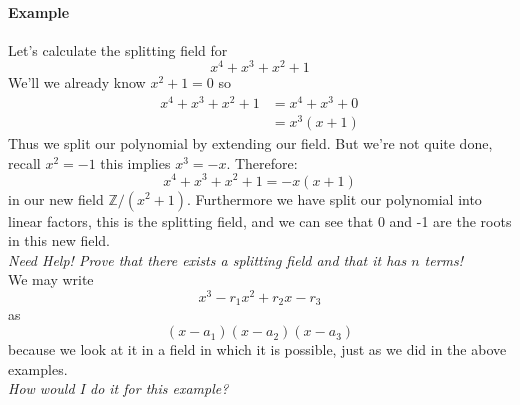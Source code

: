 \documentclass[12pt]{article}
\begin{document}
\paragraph*{Example} Let's calculate the splitting field for $$x^4+x^3+x^2+1$$  
We'll we already know $x^2+1=0$ so
\begin{align*}
x^4+x^3+x^2+1 &= x^4 + x^3 + 0 \\
&= x^3(x+1)
\end{align*}
Thus we split our polynomial by extending our field.  But we're not quite done, recall $x^2=-1$ this implies $x^3 = -x$.  Therefore:
$$x^4+x^3+x^2+1 = -x(x+1)$$ in our new field $\mathbb{Z}/(x^2+1)$.  Furthermore we have split our polynomial into linear factors, this is the splitting field, and we can see that 0 and -1 are the roots in this new field.\\

{\color{red}\emph{Need Help! Prove that there exists a splitting field and that it has $n$ terms!}}\\


We may write $$x^3 -r_1 x^2 +r_2 x - r_3$$ as $$(x-a_1)(x-a_2)(x-a_3)$$  because we look at it in a field in which it is possible, just as we did in the above examples. \\

{\color{red}\emph{How would I do it for this example?}} \\

\end{document}

